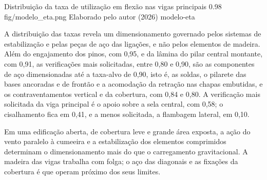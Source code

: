 \figura
{Distribuição da taxa de utilização em flexão nas vigas principais}
{0.98}
{fig/modelo_eta.png}
{Elaborado pelo autor (2026)}
{modelo-eta}
{}
{}

A distribuição das taxas revela um dimensionamento governado pelos sistemas de
estabilização e pelas peças de aço das ligações, e não pelos elementos de
madeira. Além do engajamento dos pinos, com 0,95, e da lâmina do pilar central
montante, com 0,91, as verificações mais solicitadas, entre 0,80 e 0,90, são as
componentes de aço dimensionadas até a taxa-alvo de 0,90, isto é, as soldas, o
pilarete das bases ancoradas e de frontão e a acomodação da retração nas chapas
embutidas, e os contraventamentos vertical e da cobertura, com 0,84 e 0,80. A
verificação
mais solicitada da viga principal é o apoio sobre a sela central, com 0,58; o
cisalhamento fica em 0,41, e a menos solicitada, a flambagem lateral, em 0,10.

Em uma edificação aberta, de
cobertura leve e grande área exposta, a ação do vento paralelo à cumeeira e a
estabilização dos elementos comprimidos determinam o dimensionamento mais do que
o carregamento gravitacional. A madeira das vigas trabalha com folga; o aço das
diagonais e as fixações da cobertura é que operam próximo dos seus limites.

